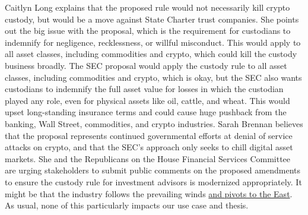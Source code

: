 Caitlyn Long explains that the proposed rule would not necessarily kill crypto custody, but would be a move against State Charter trust companies. She points out the big issue with the proposal, which is the requirement for custodians to indemnify for negligence, recklessness, or willful misconduct. This would apply to all asset classes, including commodities and crypto, which could kill the custody business broadly. The SEC proposal would apply the custody rule to all asset classes, including commodities and crypto, which is okay, but the SEC also wants custodians to indemnify the full asset value for losses in which the custodian played any role, even for physical assets like oil, cattle, and wheat. This would upset long-standing insurance terms and could cause huge pushback from the banking, Wall Street, commodities, and crypto industries. Sarah Brennan believes that the proposal represents continued governmental efforts at denial of service attacks on crypto, and that the SEC's approach only seeks to chill digital asset markets. She and the Republicans on the House Financial Services Committee are urging stakeholders to submit public comments on the proposed amendments to ensure the custody rule for investment advisors is modernized appropriately. It might be that the industry follows the prevailing winds \href{https://noelleacheson.substack.com/p/weekly-feb-25-2023}{and pivots to the East}. As usual, none of this particularly impacts our use case and thesis.
